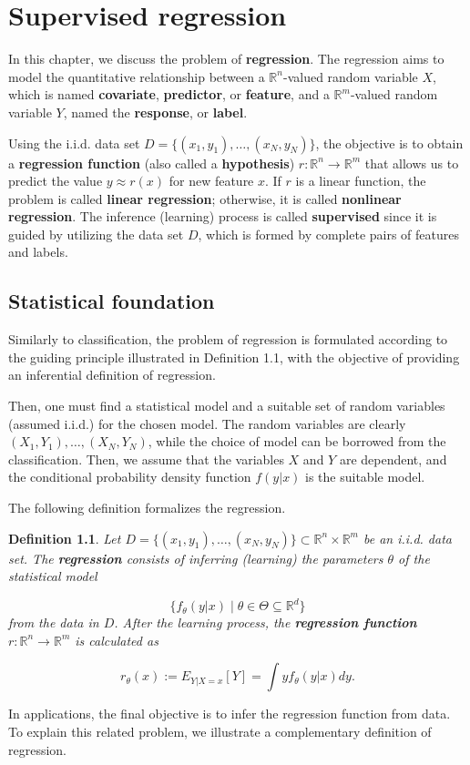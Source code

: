 \documentclass{report}
\newtheorem{definition}{Definition}[chapter]
\begin{document}
\chapter{Supervised regression}
In this chapter, we discuss the problem of \textbf{regression}. The regression aims to model the quantitative relationship between a $\mathbb{R}^n$-valued random variable $X$, which is named \textbf{covariate}, \textbf{predictor}, or \textbf{feature}, and a $\mathbb{R}^m$-valued random variable $Y$, named the \textbf{response}, or \textbf{label}.

Using the i.i.d. data set $D = \{(x_1,y_1),\dots,(x_N,y_N)\}$, the objective is to obtain a \textbf{regression function} (also called a \textbf{hypothesis}) $r : \mathbb{R}^n \to \mathbb{R}^m$ that allows us to predict the value $y \approx r(x)$ for new feature $x$. If $r$ is a linear function, the problem is called \textbf{linear regression}; otherwise, it is called \textbf{nonlinear regression}. The inference (learning) process is called \textbf{supervised} since it is guided by utilizing the data set $D$, which is formed by complete pairs of features and labels.

\section{Statistical foundation}
Similarly to classification, the problem of regression is formulated according to the guiding principle illustrated in Definition 1.1, with the objective of providing an inferential definition of regression.

Then, one must find a statistical model and a suitable set of random variables (assumed i.i.d.) for the chosen model. The random variables are clearly $(X_1,Y_1),\dots,(X_N,Y_N)$, while the choice of model can be borrowed from the classification. Then, we assume that the variables $X$ and $Y$ are dependent, and the conditional probability density function $f(y|x)$ is the suitable model.

The following definition formalizes the regression.

\begin{definition}
Let $D = \{(x_1,y_1),\dots,(x_N,y_N)\} \subset \mathbb{R}^n \times \mathbb{R}^m$ be an i.i.d. data set. The \textbf{regression} consists of inferring (learning) the parameters $\theta$ of the statistical model

\begin{equation}
\{f_\theta(y|x) \mid \theta \in \Theta \subseteq \mathbb{R}^d\}
\end{equation}
from the data in $D$. After the learning process, the \textbf{regression function} $r : \mathbb{R}^n \to \mathbb{R}^m$ is calculated as

\begin{equation}
r_\theta(x) := E_{Y|X = x}[Y] = \int yf_\theta(y|x)dy.
\end{equation}
\end{definition}
In applications, the final objective is to infer the regression function from data. To explain this related problem, we illustrate a complementary definition of regression.
\end{document}
